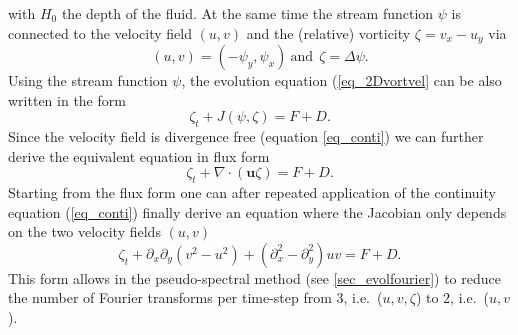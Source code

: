 with $H_{0}$ the depth of the fluid. At the same time
the stream function $\psi$ is connected to the velocity 
field $(u,v)$ and the (relative) 
vorticity $\zeta = v_{x} - u_{y}$ via
\begin{equation} \label{eq_psiuv}
  (u,v) = (- \psi_{y},\psi_{x}) \ \mbox{and} \ \ \zeta = \Delta \psi.
\end{equation}
Using the stream function $\psi$, the evolution equation (\ref{eq_2Dvortvel}
can be also written in the form
\begin{equation} \label{eq_2Dvortstream}
  \zeta_{t} + J(\psi,\zeta) = F + D.
\end{equation}
Since the velocity field is divergence free (equation \ref{eq_conti})
we can further derive the equivalent equation in flux form
\begin{equation} \label{eq_2Dflux}
  \zeta_{t} + \nabla \cdot \left(\mathbf{u} \zeta \right) = F + D.
\end{equation}
Starting from the flux form one can after repeated application of the
continuity equation (\ref{eq_conti}) finally derive an equation where
the Jacobian only depends on the two velocity fields $(u,v)$
\begin{equation} \label{eq_2Duv}
  \zeta_{t} 
   + \partial_{x} \partial_{y} \left( v^{2} - u^{2} \right) 
   + \left(\partial^{2}_{x} - \partial^{2}_{y} \right) uv
   = 
  F + D.
\end{equation}
This form allows in the pseudo-spectral method (see \ref{sec_evolfourier}) 
to reduce the number of Fourier transforms per time-step from 
$3$, i.e.\ ($u,v,\zeta$) to $2$, i.e.\ ($u,v$).  

%
